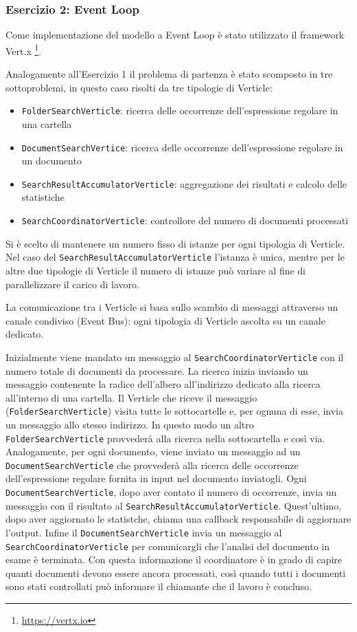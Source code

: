 \documentclass[a4paper]{article}
\begin{document}
\subsubsection{Esercizio 2: Event Loop}

Come implementazione del modello a Event Loop \`e stato utilizzato il framework Vert.x \footnote{\url{https://vertx.io}}.

Analogamente all'Esercizio 1 il problema di partenza \`e stato scomposto in tre sottoproblemi, in questo caso risolti da tre tipologie di Verticle:

\begin{itemize}
%
    \item \texttt{FolderSearchVerticle}: ricerca delle occorrenze dell'espressione regolare in una cartella
%
    \item \texttt{DocumentSearchVertice}: ricerca delle occorrenze dell'espressione regolare in un documento
%
    \item \texttt{SearchResultAccumulatorVerticle}: aggregazione dei risultati e calcolo delle statistiche
%
    \item \texttt{SearchCoordinatorVerticle}: controllore del numero di documenti processati
%
\end{itemize}

Si \`e scelto di mantenere un numero fisso di istanze per ogni tipologia di Verticle.
%
Nel caso del \texttt{SearchResultAccumulatorVerticle} l'istanza \`e unica, mentre per le altre due tipologie di Verticle il numero di istanze pu\`o variare al fine di parallelizzare il carico di lavoro.

La comunicazione tra i Verticle si basa sullo scambio di messaggi attraverso un canale condiviso (Event Bus): ogni tipologia di Verticle ascolta su un canale dedicato.

Inizialmente viene mandato un messaggio al \texttt{SearchCoordinatorVerticle} con il numero totale di documenti da processare. 
%
La ricerca inizia inviando un messaggio contenente la radice dell'albero all'indirizzo dedicato alla ricerca all'interno di una cartella.
%
Il Verticle che riceve il messaggio (\texttt{FolderSearchVerticle}) visita tutte le sottocartelle e, per ognuna di esse, invia un messaggio allo stesso indirizzo.
%
In questo modo un altro \texttt{FolderSearchVerticle} provveder\`a alla ricerca nella sottocartella e cos\`i via.
%
Analogamente, per ogni documento, viene inviato un messaggio ad un \texttt{DocumentSearchVerticle} che provveder\`a alla ricerca delle occorrenze dell'espressione regolare fornita in input nel documento inviatogli.
%
Ogni \texttt{DocumentSearchVerticle}, dopo aver contato il numero di occorrenze, invia un messaggio con il risultato al \texttt{SearchResultAccumulatorVerticle}. Quest'ultimo, dopo aver aggiornato le statistche, chiama una callback responsabile di aggiornare l'output.
%
Infine il \texttt{DocumentSearchVerticle} invia un messaggio al \texttt{SearchCoordinatorVerticle} per comunicargli che l'analisi del documento in esame è terminata. Con questa informazione il coordinatore è in grado di capire quanti documenti devono essere ancora processati, così quando tutti i documenti sono stati controllati può informare il chiamante che il lavoro è concluso.
%
\end{document}
